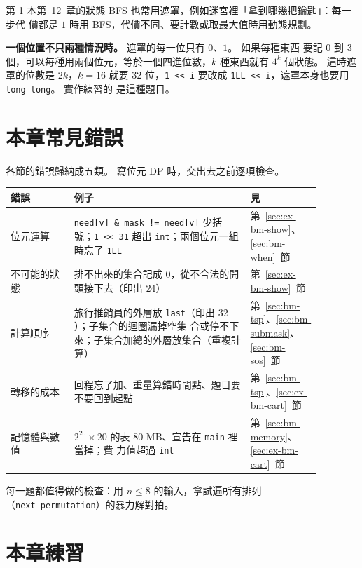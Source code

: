 第 1 本第~12~章的狀態 BFS 也常用遮罩，例如迷宮裡「拿到哪幾把鑰匙」：每一步代
價都是 $1$ 時用 BFS，代價不同、要計數或取最大值時用動態規劃。

\textbf{一個位置不只兩種情況時。} 遮罩的每一位只有 $0$、$1$。 如果每種東西
要記 $0$ 到 $3$ 個，可以每種用兩個位元，等於一個四進位數，$k$ 種東西就有
$4^k$ 個狀態。 這時遮罩的位數是 $2k$，$k = 16$ 就要 $32$ 位，\texttt{1 << i}
要改成 \texttt{1LL << i}，遮罩本身也要用 \texttt{long long}。 實作練習的
 是這種題目。

\section{本章常見錯誤}
\label{sec:bm-pitfalls}

各節的錯誤歸納成五類。 寫位元 DP 時，交出去之前逐項檢查。

\begin{center}
\begin{tabular}{p{0.18\linewidth}p{0.5\linewidth}p{0.2\linewidth}}
\toprule
錯誤 & 例子 & 見 \\
\midrule
位元運算 & \texttt{need[v] \& mask != need[v]} 少括號；\texttt{1 << 31} 超出
\texttt{int}；兩個位元一組時忘了 \texttt{1LL} & 第~\ref{sec:ex-bm-show}、\ref{sec:bm-when}~節 \\
不可能的狀態 & 排不出來的集合記成 $0$，從不合法的開頭接下去（印出 $24$） &
第~\ref{sec:ex-bm-show}~節 \\
計算順序 & 旅行推銷員的外層放 \texttt{last}（印出 $32$）；子集合的迴圈漏掉空集
合或停不下來；子集合加總的外層放集合（重複計算） & 第~\ref{sec:bm-tsp}、\ref{sec:bm-submask}、\newline\ref{sec:bm-sos}~節 \\
轉移的成本 & 回程忘了加、重量算錯時間點、題目要不要回到起點 &
第~\ref{sec:bm-tsp}、\ref{sec:ex-bm-cart}~節 \\
記憶體與數值 & $2^{20} \times 20$ 的表 $80$ MB、宣告在 \texttt{main} 裡當掉；費
力值超過 \texttt{int} & 第~\ref{sec:bm-memory}、\ref{sec:ex-bm-cart}~節 \\
\bottomrule
\end{tabular}
\end{center}

每一題都值得做的檢查：用 $n \le 8$ 的輸入，拿試遍所有排列
（\texttt{next\_permutation}）的暴力解對拍。

\section{本章練習}
\label{sec:bm-exercises}

